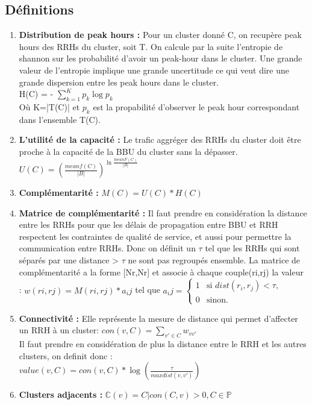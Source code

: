 \documentclass{report}
\begin{document}
\subsection{Définitions}
\begin{enumerate}
  \item \textbf{Distribution de peak hours :} Pour un cluster donné C, on recupère peak hours des RRHs du cluster, soit T. 
  On calcule par la suite l'entropie de shannon sur les probabilité d'avoir un peak-hour dans le cluster. 
  Une grande valeur de l'entropie implique une grande uncertitude ce qui veut dire une grande dispersion entre 
  les peak hours dans le cluster.\\
  H(C) = - $\sum_{k=1}^{K}p_{k} \log p_{k}$ \\
  Où K=|T(C)| et $p_{k}$ est la propabilité d'observer le peak hour correspondant dans l'ensemble T(C).
  \item \textbf{L'utilité de la capacité :} Le trafic aggréger des RRHs du cluster doit être proche à la capacité de la BBU du cluster sans la dépasser.\\
  $U(C)= \left(\frac{meanf(C)}{|B|}\right)^{\ln\frac{meanF(C)}{|B|} }$ 
  \item \textbf{Complémentarité :} $M(C) = U(C)*H(C)$
  \item \textbf{Matrice de complémentarité :} Il faut prendre en considération la distance entre les RRHs pour que les délais 
  de propagation entre BBU et RRH respectent les contraintes de qualité de service, et aussi pour permettre la communication 
  entre RRHs. Donc on définit un $\tau$ tel que les RRHs qui sont séparés par une distance > $\tau$ ne sont pas regroupés ensemble. 
  La matrice de complémentarité a la forme [Nr,Nr] et associe à chaque couple(ri,rj) la valeur :
  $w(ri,rj)= M({ri,rj})*a_ij$ tel que $a_ij = \begin{cases}
    1 & \text{si $dist(r_i,r_j) < \tau$,} \\
    0 & \text{sinon.}
    \end{cases}$ 
  \item \textbf{Connectivité :} Elle représente la mesure de distance qui permet d'affecter un RRH à un cluster:      $con(v,C)=\sum_{v'\in C}w_{vv'}$ \\
  Il faut prendre en considération de plus la distance entre le RRH et les autres clusters, on definit donc : \\
  $value(v,C)=con(v,C)*\log{\left(\frac{\tau}{max{dist(v,v')}}\right)} $ 
  \item \textbf{Clusters adjacents :} $\mathbb{C}(v)= {C| con(C,v) >0, C \in \mathbb{P}} $
\end{enumerate}
\end{document}

